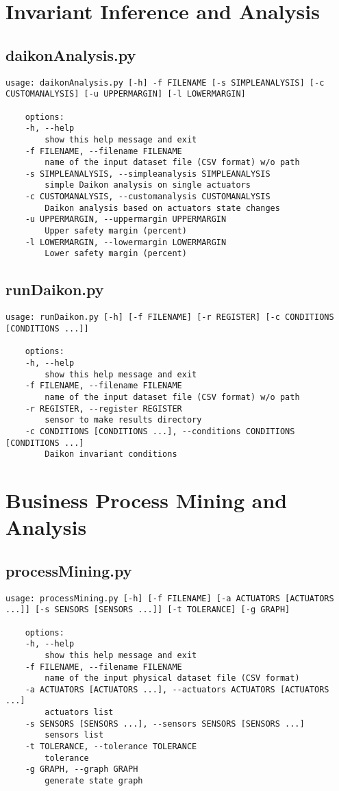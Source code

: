 \section*{Invariant Inference and Analysis}
\subsection*{daikonAnalysis.py}
\begin{lstlisting}[numbers=none]
	usage: daikonAnalysis.py [-h] -f FILENAME [-s SIMPLEANALYSIS] [-c CUSTOMANALYSIS] [-u UPPERMARGIN] [-l LOWERMARGIN]
	
	options:
	-h, --help            
		show this help message and exit
	-f FILENAME, --filename FILENAME
		name of the input dataset file (CSV format) w/o path
	-s SIMPLEANALYSIS, --simpleanalysis SIMPLEANALYSIS
		simple Daikon analysis on single actuators
	-c CUSTOMANALYSIS, --customanalysis CUSTOMANALYSIS
		Daikon analysis based on actuators state changes
	-u UPPERMARGIN, --uppermargin UPPERMARGIN
		Upper safety margin (percent)
	-l LOWERMARGIN, --lowermargin LOWERMARGIN
		Lower safety margin (percent)
\end{lstlisting}
\subsection*{runDaikon.py}
\begin{lstlisting}[numbers=none]
	usage: runDaikon.py [-h] [-f FILENAME] [-r REGISTER] [-c CONDITIONS [CONDITIONS ...]]
	
	options:
	-h, --help            
		show this help message and exit
	-f FILENAME, --filename FILENAME
		name of the input dataset file (CSV format) w/o path
	-r REGISTER, --register REGISTER
		sensor to make results directory
	-c CONDITIONS [CONDITIONS ...], --conditions CONDITIONS [CONDITIONS ...]
		Daikon invariant conditions
\end{lstlisting}

\section*{Business Process Mining and Analysis}
\subsection*{processMining.py}
\begin{lstlisting}[numbers=none]
	usage: processMining.py [-h] [-f FILENAME] [-a ACTUATORS [ACTUATORS ...]] [-s SENSORS [SENSORS ...]] [-t TOLERANCE] [-g GRAPH]
	
	options:
	-h, --help            
		show this help message and exit
	-f FILENAME, --filename FILENAME
		name of the input physical dataset file (CSV format)
	-a ACTUATORS [ACTUATORS ...], --actuators ACTUATORS [ACTUATORS ...]
		actuators list
	-s SENSORS [SENSORS ...], --sensors SENSORS [SENSORS ...]
		sensors list
	-t TOLERANCE, --tolerance TOLERANCE
		tolerance
	-g GRAPH, --graph GRAPH
		generate state graph
\end{lstlisting}